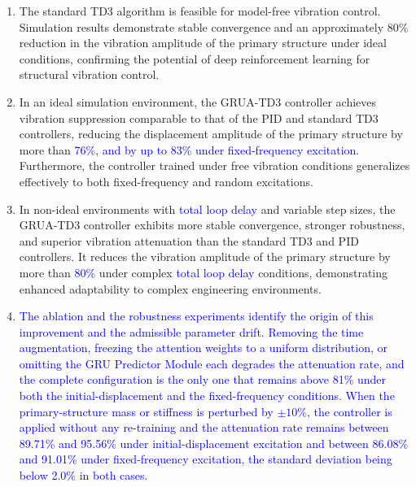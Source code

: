 \documentclass[review]{elsarticle}
\begin{document}
\begin{enumerate}
\item The standard TD3 algorithm is feasible for model-free vibration control. Simulation results demonstrate stable convergence and an approximately 80\% reduction in the vibration amplitude of the primary structure under ideal conditions, confirming the potential of deep reinforcement learning for structural vibration control.

\item In an ideal simulation environment, the GRUA-TD3 controller achieves vibration suppression comparable to that of the PID and standard TD3 controllers, reducing the displacement amplitude of the primary structure by more than \textcolor{blue}{76\%, and by up to 83\% under fixed-frequency excitation}.
Furthermore, the controller trained under free vibration conditions generalizes effectively to both fixed-frequency and random excitations.

\item In non-ideal environments with \textcolor{blue}{total loop delay} and variable step sizes, the GRUA-TD3 controller exhibits more stable convergence, stronger robustness, and superior vibration attenuation than the standard TD3 and PID controllers.
It reduces the vibration amplitude of the primary structure by more than \textcolor{blue}{80\%} under complex \textcolor{blue}{total loop delay} conditions, demonstrating enhanced adaptability to complex engineering environments.

\item \textcolor{blue}{The ablation and the robustness experiments identify the origin of this improvement and the admissible parameter drift. Removing the time augmentation, freezing the attention weights to a uniform distribution, or omitting the GRU Predictor Module each degrades the attenuation rate, and the complete configuration is the only one that remains above 81\% under both the initial-displacement and the fixed-frequency conditions. When the primary-structure mass or stiffness is perturbed by $\pm10\%$, the controller is applied without any re-training and the attenuation rate remains between 89.71\% and 95.56\% under initial-displacement excitation and between 86.08\% and 91.01\% under fixed-frequency excitation, the standard deviation being below 2.0\% in both cases.}
\end{enumerate}
\end{document}
